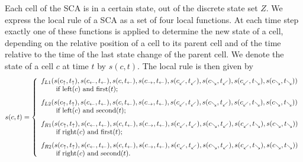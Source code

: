 \documentclass[pre,amssymb,showpacs,showkeys,preprint]{revtex4}
\begin{document}
Each cell of the SCA is in a certain state, out of the discrete state set $Z$.
We express the local rule of a SCA as a set of four local functions.
At each time step exactly one of these functions is applied to determine the new state of a cell,
depending on the relative position of a cell to its parent cell and of the time relative to
the time of the last state change of the parent cell.
We denote the state of a cell $c$ at time $t$ by $s(c,t)$.
The local rule is then given by
\[
s(c,t) = \left\{
\begin{array}{l}
f_{L1}(
	s(c_\uparrow, t_\uparrow),
	s(c_\leftarrow, t_\leftarrow), s(c, t_\leftarrow), s(c_\rightarrow, t_\leftarrow),
	s(c_\swarrow, t_\swarrow), s(c_\searrow, t_\swarrow),
	s(c_\swarrow, t_\searrow), s(c_\searrow, t_\searrow)
)
\\
\hspace{0.3in} \mbox{if left$(c)$ and first$(t)$;} \vspace{0.1in}
\\
f_{L2}(
	s(c_\uparrow, t_\uparrow),
	s(c_\leftarrow, t_\leftarrow), s(c, t_\leftarrow), s(c_\rightarrow, t_\leftarrow),
	s(c_\swarrow, t_\swarrow), s(c_\searrow, t_\swarrow),
	s(c_\swarrow, t_\searrow), s(c_\searrow, t_\searrow)
)
\\
\hspace{0.3in} \mbox{if left$(c)$ and second$(t);$}  \vspace{0.1in}
\\
f_{R1}(
	s(c_\uparrow, t_\uparrow),
	s(c_\leftarrow, t_\leftarrow), s(c, t_\leftarrow), s(c_\rightarrow, t_\leftarrow),
	s(c_\swarrow, t_\swarrow), s(c_\searrow, t_\swarrow),
	s(c_\swarrow, t_\searrow), s(c_\searrow, t_\searrow)
)
\\
\hspace{0.3in} \mbox{if right$(c)$ and first$(t)$;} \vspace{0.1in}
\\
f_{R2}(
	s(c_\uparrow, t_\uparrow),
	s(c_\leftarrow, t_\leftarrow), s(c, t_\leftarrow), s(c_\rightarrow, t_\leftarrow),
	s(c_\swarrow, t_\swarrow), s(c_\searrow, t_\swarrow),
	s(c_\swarrow, t_\searrow), s(c_\searrow, t_\searrow)
)
\\
\hspace{0.3in} \mbox{if right$(c)$ and second$(t).$} \\

\end{array}
\right.
\]
\end{document}
